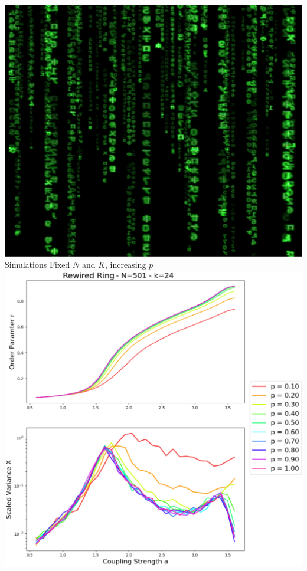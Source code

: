 \documentclass[serif,mathserif]{beamer}
\begin{document}
\begin{frame}{\includegraphics[height=0.06\textheight]{matrix.eps}\hspace{0.25cm} Simulations}
    \centering
    Fixed $N$ and $K$, increasing $p$\\
    \vspace{0.25cm}
    \includegraphics[height=0.8\textheight]{rvsavsp.eps}
\end{frame}
\end{document}
